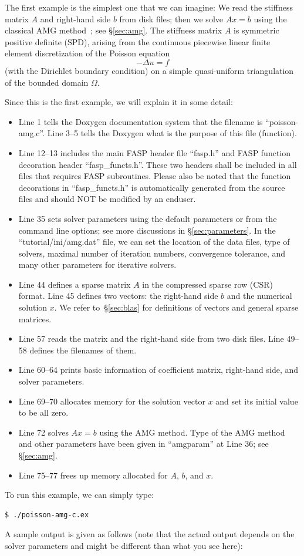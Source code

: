 \documentclass[11pt]{memoir}
\begin{document}
The first example is the simplest one that we can imagine: We read the stiffness matrix $A$ and right-hand side $b$ from disk files; then we solve $Ax=b$ using the classical AMG method~\cite{Brandt.BrandtMcCormick.1982uq,Ruge.RugeStuben.1985ij,Ruge.RugeStuben.1987bs}; see \S\ref{sec:amg}. The stiffness matrix $A$ is symmetric positive definite (SPD), arising from the continuous piecewise linear finite element discretization of the Poisson equation 
$$-\Delta u = f$$ 
(with the Dirichlet boundary condition) on a simple quasi-uniform triangulation of the bounded domain $\Omega$.
%

%
Since this is the first example, we will explain it in some detail:
\begin{itemize}
%
\item Line 1 tells the Doxygen documentation system that the filename is ``poisson-amg.c''. Line 3--5 tells the Doxygen what is the purpose of this file (function). 
%
\item Line 12--13 includes the main FASP header file ``fasp.h'' and FASP function decoration header ``fasp\_functs.h''. These two headers shall be included in all files that requires FASP subroutines. Please also be noted that the function decorations in ``fasp\_functs.h'' is automatically generated from the source files and should NOT be modified by an enduser. 
%
\item Line 35 sets solver parameters using the default parameters or from the command line options; see more discussions in \S\ref{sec:parameters}. In the  ``tutorial/ini/amg.dat'' file, we can set the location of the data files, type of solvers, maximal number of iteration numbers, convergence tolerance, and many other parameters for iterative solvers.
%
\item Line 44 defines a sparse matrix $A$ in the compressed sparse row (CSR) format. Line 45 defines two vectors: the right-hand side $b$ and the numerical solution $x$. We refer to~\S\ref{sec:blas} for definitions of vectors and general sparse matrices.
%
\item Line 57 reads the matrix and the right-hand side from two disk files. Line 49--58 defines the filenames of them.
%
\item Line 60--64 prints basic information of coefficient matrix, right-hand side, and solver parameters.
%
\item Line 69--70 allocates memory for the solution vector $x$ and set its initial value to be all zero.
%
\item Line 72 solves $Ax=b$ using the AMG method. Type of the AMG method and other parameters have been given in ``amgparam'' at Line 36; see \S\ref{sec:amg}.
%
\item Line 75--77 frees up memory allocated for $A$, $b$, and $x$.
\end{itemize}
%
To run this example, we can simply type:
%
\begin{lstlisting}[numbers=none]
$ ./poisson-amg-c.ex
\end{lstlisting}
%
A sample output is given as follows (note that the actual output depends on the solver parameters and might be different than what you see here):
%

\end{document}
